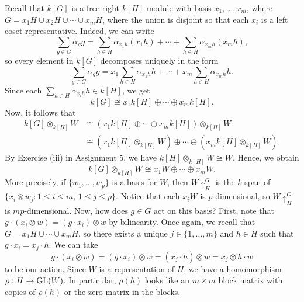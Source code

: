 Recall that $k[G]$ is a free right $k[H]$-module with basis $x_1, \dots, x_m$, 
where $G = x_1H \cup x_2H \cup \cdots \cup x_mH$, where the union is disjoint 
so that each $x_i$ is a left coset representative. Indeed, we can write 
\[ \sum_{g\in G} \alpha_g g = \sum_{h\in H} \alpha_{x_1h}(x_1h) + \cdots + 
\sum_{h\in H} \alpha_{x_mh}(x_mh), \] 
so every element in $k[G]$ decomposes uniquely in the form 
\[ \sum_{g\in G} \alpha_g g = x_1 \sum_{h\in H} \alpha_{x_1h}h + 
\cdots + x_m \sum_{h\in H} \alpha_{x_mh}h. \] 
Since each $\sum_{h\in H}\alpha_{x_ih}h \in k[H]$, we get 
\[ k[G] \cong x_1 k[H] \oplus \cdots \oplus x_m k[H]. \] 
Now, it follows that 
\begin{align*}
    k[G] \otimes_{k[H]} W 
    &\cong (x_1 k[H] \oplus \cdots \oplus x_m k[H]) \otimes_{k[H]} W \\ 
    &\cong (x_1 k[H] \otimes_{k[H]} W) \oplus \cdots \oplus 
    (x_m k[H] \otimes_{k[H]} W). 
\end{align*}
By Exercise (iii) in Assignment 5, we have $k[H] \otimes_{k[H]} W \cong W$. 
Hence, we obtain 
\[ k[G] \otimes_{k[H]} W \cong x_1 W \oplus \cdots \oplus x_m W. \] 
More precisely, if $\{w_1, \dots, w_p\}$ is a basis for $W$, then 
$W \uparrow_H^G$ is the $k$-span of $\{x_i \otimes w_j : 
1 \leq i \leq m,\, 1 \leq j \leq p\}$. Notice that each $x_i W$ is 
$p$-dimensional, so $W \uparrow_H^G$ is $mp$-dimensional. Now, how does 
$g \in G$ act on this basis? First, note that $g \cdot (x_i \otimes w) = 
(g \cdot x_i) \otimes w$ by bilinearity. Once again, we recall that 
$G = x_1H \cup \cdots \cup x_m H$, so there exists a unique $j \in 
\{1, \dots, m\}$ and $h \in H$ such that $g \cdot x_i = x_j \cdot h$. We can take 
\[ g \cdot (x_i \otimes w) = (g \cdot x_i) \otimes w = (x_j \cdot h) \otimes w 
= x_j \otimes h \cdot w \] 
to be our action. Since $W$ is a representation of $H$, we have a homomorphism
$\rho : H \to \operatorname{GL}(W)$. In particular, $\rho(h)$ looks like an $m \times m$ 
block matrix with copies of $\rho(h)$ or the zero matrix in the blocks. 

